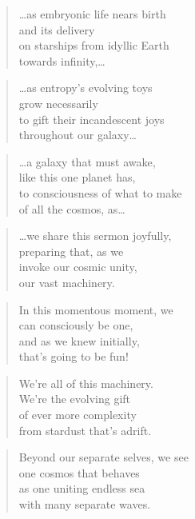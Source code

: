 \documentclass[10pt,a4paper]{article}
\begin{document}
\begin{paracol}{2}
\begin{verse}
…as embryonic life nears birth\\
and its delivery\\
on starships from idyllic Earth\\
towards infinity,…
\end{verse}

\begin{verse}
…as entropy’s evolving toys\\
grow necessarily\\
to gift their incandescent joys\\
throughout our galaxy…
\end{verse}

\begin{verse}
…a galaxy that must awake,\\
like this one planet has,\\
to consciousness of what to make\\
of all the cosmos, as…
\end{verse}

\begin{verse}
…we share this sermon joyfully,\\
preparing that, as we\\
invoke our cosmic unity,\\
our vast machinery.
\end{verse}

\begin{verse}
In this momentous moment, we\\
can consciously be one,\\
and as we knew initially,\\
that’s going to be fun!
\end{verse}

\begin{verse}
We’re all of this machinery.\\
We’re the evolving gift\\
of ever more complexity\\
from stardust that’s adrift.
\end{verse}

\begin{verse}
Beyond our separate selves, we see\\
one cosmos that behaves\\
as one uniting endless sea\\
with many separate waves.
\end{verse}


\end{paracol}
\end{document}

